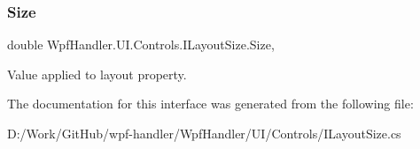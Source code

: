 \subsubsection{\texorpdfstring{Size}{Size}}
{\footnotesize\ttfamily double Wpf\+Handler.\+U\+I.\+Controls.\+I\+Layout\+Size.\+Size\hspace{0.3cm}{\ttfamily [get]}, {\ttfamily [set]}}



Value applied to layout property. 



The documentation for this interface was generated from the following file\+:\begin{DoxyCompactItemize}
\item 
D\+:/\+Work/\+Git\+Hub/wpf-\/handler/\+Wpf\+Handler/\+U\+I/\+Controls/I\+Layout\+Size.\+cs\end{DoxyCompactItemize}
